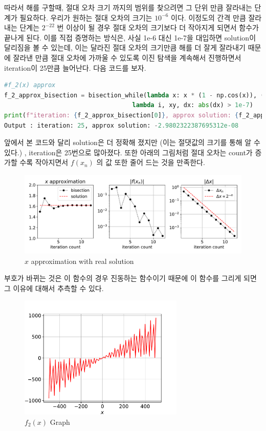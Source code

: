 \documentclass[11pt]{article}
\begin{document}
따라서 해를 구할때, 절대 오차 크기 까지의 범위를 찾으려면 그 단위 만큼 잘라내는 단계가 필요하다. 우리가 원하는 절대 오차의 크기는 $10^{-6}$ 이다. 이정도의 간격 만큼 잘라내는 단계는 $2^{-22}$ 번 이상이 될 경우 절대 오차의 크기보다 더 작아지게 되면서 함수가 끝나게 된다. 이를 직접 증명하는 방식은, 사실 1e-6 대신 1e-7을 대입하면 solution이 달리짐을 볼 수 있는데, 이는 달라진 절대 오차의 크기만큼 해를 더 잘게 잘라내기 때문에 잘라낸 만큼 절대 오차에 가까울 수 있도록 이진 탐색을 계속해서 진행하면서 iteration이 25만큼 늘어난다. 다음 코드를 보자. 
\begin{lstlisting}[language=Python]
#f_2(x) approx
f_2_approx_bisection = bisection_while(lambda x: x * (1 - np.cos(x)), (-2,1),
                                   lambda i, xy, dx: abs(dx) > 1e-7)
print(f"iteration: {f_2_approx_bisection[0]}, approx solution: {f_2_approx_bisection[1]}")
Output : iteration: 25, approx solution: -2.9802322387695312e-08
\end{lstlisting}
\noindent  
앞에서 본 코드와 달리 solution은 더 정확해 졌지만 (이는 절댓값의 크기를 통해 알 수 있다.) , iteration은 25번으로 많아졌다. 또한 아래의 그림처럼 절대 오차는 count가 증가할 수록 작아지면서 $f(x_n)$ 의 값 또한 줄어 드는 것을 만족한다. 
\begin{figure}[!ht]
  \centering
  \includegraphics[width=1\textwidth]{bisection_sol_Method_approximation.pdf}
  \caption{$x$ approximation with real solution}
\end{figure}

\noindent  
부호가 바뀌는 것은 이 함수의 경우 진동하는 함수이기 때문에 이 함수를 그리게 되면 그 이유에 대해서 추측할 수 있다. 

\begin{figure}[!ht]
  \centering
  \includegraphics[width=0.7\textwidth]{f_2(x).pdf}
  \caption{$f_2(x)$ Graph}
\end{figure}
\end{document}
